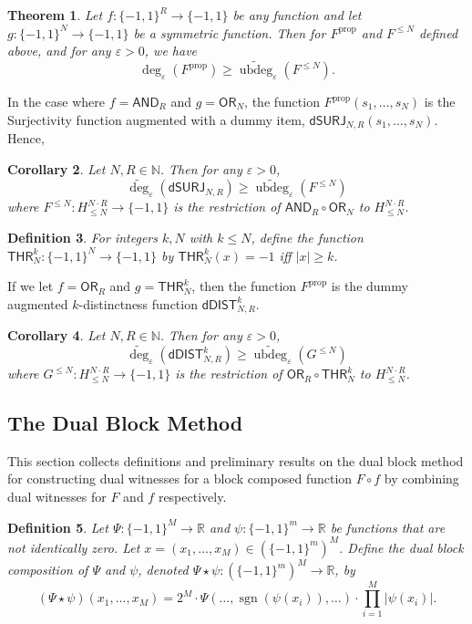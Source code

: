 \documentclass[11pt, letterpaper, fleqn]{article}
\newtheorem{theorem}{Theorem}
\newtheorem{definition}[theorem]{Definition}
\newtheorem{corollary}[theorem]{Corollary}
\theoremstyle{plain}
\newcommand{\R}{\mathbb{R}}
\newcommand{\sgn}{\mathrm{sign}}
\newcommand{\dumSURJ}{\mathsf{dSURJ}}
\newcommand{\dumDIST}{\mathsf{dDIST}}
\newcommand{\OR}{\mathsf{ OR}}
\newcommand{\THR}{\mathsf{THR}}
\newcommand{\bits}{\{-1,1\}}
\newcommand{\ls}{\star}
\newcommand{\N}{\mathbb{N}}
\newcommand{\eps}{\varepsilon}
\newcommand{\adeg}{\widetilde{\operatorname{deg}}}
\newcommand{\ubdeg}{\widetilde{\operatorname{ubdeg}}}
\newcommand{\AND}{\mathsf{AND}}
\renewcommand{\sgn}{\operatorname{sgn}}
\begin{document}
\begin{theorem} \label{thm:main-reduction}
Let $f : \bits^R \to \bits$ be any function and let $g : \bits^N \to \bits$ be a symmetric function. Then for $F^{\operatorname{prop}}$ and $F^{\le N}$ defined above, and for any $\eps > 0$, we have
\[\deg_\eps(F^{\operatorname{prop}}) \ge \ubdeg_\eps(F^{\le N}).\]
\end{theorem}


In the case where $f = \AND_R$ and $g = \OR_N$, the function $F^{\operatorname{prop}}(s_1, \dots, s_N)$ is the Surjectivity function augmented with a dummy item, $\dumSURJ_{N, R}(s_1, \dots, s_N)$. Hence,

\begin{corollary} \label{cor:surj-reduction}
Let $N, R \in \N$. Then for any $\eps > 0$,
\[\adeg_\eps(\dumSURJ_{N, R}) \ge \ubdeg_\eps(F^{\le N})\]
where $F^{\le N} : H^{N\cdot R}_{\le N} \to \bits$ is the restriction of $\AND_R \circ \OR_N$ to $H^{N\cdot R}_{\le N}$.
\end{corollary}


\begin{definition}
For integers $k, N$ with $k \le N$, define the function $\THR^k_N : \bits^N \to \bits$ by $\THR^k_N(x) = -1$ iff $|x| \ge k$.
\end{definition}


If we let $f = \OR_R$ and $g = \THR_N^k$, then the function $F^{\operatorname{prop}}$ is the dummy augmented $k$-distinctness function $\dumDIST_{N, R}^k$.


\begin{corollary} \label{cor:dist-reduction}
Let $N, R \in \N$. Then for any $\eps > 0$,
\[\adeg_\eps(\dumDIST^k_{N, R}) \ge \ubdeg_\eps(G^{\le N})\]
where $G^{\le N} : H^{N\cdot R}_{\le N} \to \bits$ is the restriction of $\OR_R \circ \THR^k_N$ to $H^{N\cdot R}_{\le N}$.
\end{corollary}


\subsection{The Dual Block Method}
This section collects definitions and preliminary results on the dual block method \cite{shizhu, lee, sherstovhalfspaces1}
for constructing dual witnesses for a block composed function $F \circ f$ by combining dual witnesses
for $F$ and $f$ respectively.
\label{sec:ls}
\begin{definition}
Let $\Psi : \bits^M \to \R$ and $\psi : \bits^m \to \R$ be functions that are not identically zero. Let $x=(x_1, \dots, x_M) \in \left(\bits^{m}\right)^M$. Define the \emph{dual block composition} of $\Psi$ and $\psi$, denoted $\Psi \ls \psi : (\bits^m)^M \to \R$, by
\[(\Psi \ls \psi)(x_1, \dots, x_M) = 2^M \cdot \Psi(\dots, \sgn\left(\psi(x_i)\right), \dots) \cdot \prod_{i = 1}^M |\psi(x_i)|.\]
\end{definition}
\end{document}

